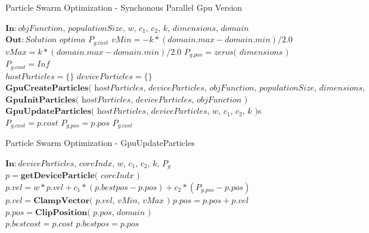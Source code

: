 \documentclass[journal,onecolumn]{IEEEtran}
\begin{document}
\begin{algorithm}[H]
    \caption{Particle Swarm Optimization - Synchonous Parallel Gpu Version}\label{alg:PSOgpu}
    \begin{algorithmic}[1]
        \State $\textbf{In}: \textit{objFunction, populationSize, w, $c_{1}$, $c_{2}$, k, dimensions, domain}$
        \State $\textbf{Out}: \textit{Solution optima } P_{g.cost}$
        \State $vMin = -k * ( domain.max - domain.min ) / 2.0$
        \State $vMax =  k * ( domain.max - domain.min ) / 2.0$
        \State $P_{g.pos} = \textit{zeros( dimensions )}$ 
        \State $P_{g.cost} = Inf$ 
        \\
        \State $hostParticles = \lbrace \rbrace$
        \State $deviceParticles = \lbrace \rbrace$
        \State $\textbf{GpuCreateParticles}\textit{( hostParticles, deviceParticles, objFunction, populationSize, dimensions, domain )}$
        \State $\textbf{GpuInitParticles}\textit{( hostParticles, deviceParticles, objFunction )}$
        \\
         
            \State $\textbf{GpuUpdateParticles}\textit{( hostParticles, deviceParticles, w, $c_{1}$, $c_{2}$, k )}$s
                    \State $P_{g.cost} = p.cost$ 
                    \State $P_{g.pos} = p.pos$
                \EndIf
            \EndFor
        \EndWhile
        \Return $P_{g.cost}$
    \end{algorithmic}
\end{algorithm}

\begin{algorithm}[H]
    \caption{Particle Swarm Optimization - GpuUpdateParticles}\label{alg:PSOgpu_kernel_updateparticles}
    \begin{algorithmic}[1]
        \State $\textbf{In}: \textit{deviceParticles, coreIndx, w, $c_{1}$, $c_{2}$, k, $P_{g}$}$
        \State $p = \textbf{getDeviceParticle}\textit{( coreIndx )}$
        \State $p.vel = w * p.vel + 
                        c_{1} * ( p.bestpos - p.pos ) + 
                        c_{2} * ( P_{g.pos} - p.pos )$ 
        \State $p.vel = \textbf{ClampVector}\textit{( p.vel, vMin, vMax )}$
        \State $p.pos = p.pos + p.vel$ 
        \State $p.pos = \textbf{ClipPosition}\textit{( p.pos, domain )}$
        \\
            \State $p.bestcost = p.cost$ 
            \State $p.bestpos = p.pos$
        \EndIf
    \end{algorithmic}
\end{algorithm}
\end{document}
